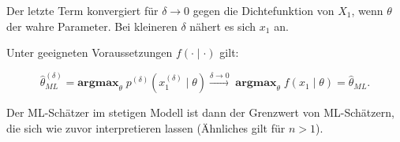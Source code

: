 \documentclass[10pt]{article}
\begin{document}
	Der letzte Term konvergiert für  $\delta \rightarrow 0$ gegen die Dichtefunktion von $X_1$, wenn $\theta$ der wahre Parameter. Bei kleineren $\delta$ nähert es sich $x_1$ an. 
	
	Unter geeigneten Voraussetzungen $f(\cdot\mid\cdot)$ gilt:
	
	\begin{equation*}
		\hat{\theta}_{ML}^{\left(\delta\right)} = \textbf{argmax}_\theta \; p^{\left(\delta\right)} (x^{\left(\delta\right)}_1 \mid \theta) \overset{\delta \rightarrow 0} \longrightarrow \;\textbf{argmax}_\theta \; f(x_1 \mid \theta) = \hat{\theta}_{ML}.
	\end{equation*}
	
	Der ML-Schätzer im stetigen Modell ist dann der Grenzwert von ML-Schätzern, die sich wie zuvor interpretieren lassen (Ähnliches gilt für $n>1$).
	
\end{document}
